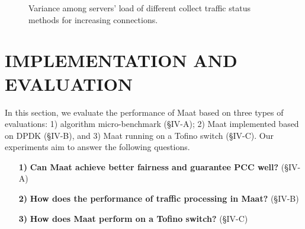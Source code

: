\begin{figure}[ht]
	\setlength{\abovecaptionskip}{0pt}
	\setlength{\belowcaptionskip}{-10pt}
	\centering
	\vspace{0pt}
	\caption{Variance among servers’ load of different collect traffic status methods for increasing connections.}
	\label{9}
\end{figure}

\section{IMPLEMENTATION AND EVALUATION}
In this section, we evaluate the performance of Maat based on three types of evaluations: 1) algorithm micro-benchmark (\S IV-A); 2) Maat implemented based on DPDK (\S IV-B), and 3) Maat running on a Tofino switch (\S IV-C). Our experiments aim to answer the following questions.
\begin{itemize}
	\item[\textbf{1)}] \textbf{Can Maat achieve better fairness and guarantee PCC well?} (\S IV-A)
	\item[\textbf{2)}] \textbf{How does the performance of traffic processing in Maat?} (\S IV-B)
	\item[\textbf{3)}] \textbf{How does Maat perform on a Tofino switch?} (\S IV-C)
\end{itemize}


